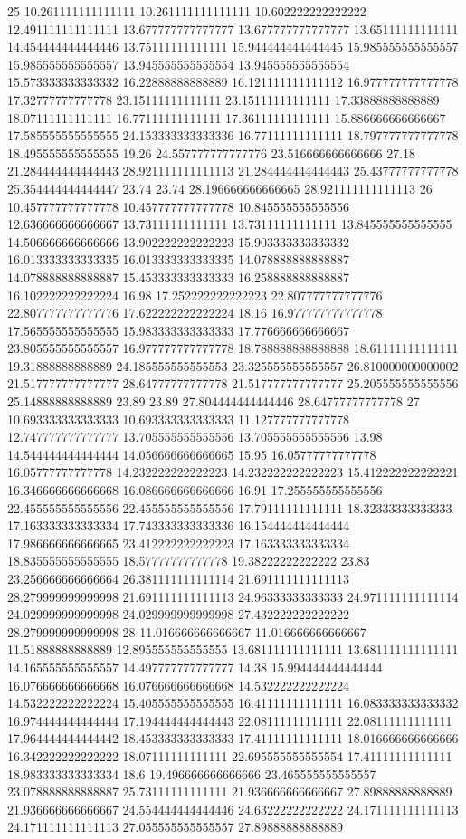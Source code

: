 25 10.261111111111111 10.261111111111111 10.602222222222222 12.491111111111111 13.677777777777777 13.677777777777777 13.65111111111111 14.454444444444446 13.75111111111111 15.944444444444445 15.985555555555557 15.985555555555557 13.945555555555554 13.945555555555554 15.573333333333332 16.22888888888889 16.121111111111112 16.977777777777778 17.32777777777778 23.15111111111111 23.15111111111111 17.33888888888889 18.07111111111111 16.77111111111111 17.36111111111111 15.886666666666667 17.585555555555555 24.153333333333336 16.77111111111111 18.797777777777778 18.495555555555555 19.26 24.557777777777776 23.516666666666666 27.18 21.284444444444443 28.921111111111113 21.284444444444443 25.43777777777778 25.354444444444447 23.74 23.74 28.196666666666665 28.921111111111113
26 10.457777777777778 10.457777777777778 10.845555555555556 12.636666666666667 13.73111111111111 13.73111111111111 13.845555555555555 14.506666666666666 13.902222222222223 15.903333333333332 16.013333333333335 16.013333333333335 14.078888888888887 14.078888888888887 15.453333333333333 16.258888888888887 16.102222222222224 16.98 17.252222222222223 22.807777777777776 22.807777777777776 17.622222222222224 18.16 16.977777777777778 17.565555555555555 15.983333333333333 17.776666666666667 23.805555555555557 16.977777777777778 18.788888888888888 18.61111111111111 19.31888888888889 24.185555555555553 23.325555555555557 26.810000000000002 21.517777777777777 28.64777777777778 21.517777777777777 25.205555555555556 25.14888888888889 23.89 23.89 27.804444444444446 28.64777777777778
27 10.693333333333333 10.693333333333333 11.127777777777778 12.747777777777777 13.705555555555556 13.705555555555556 13.98 14.544444444444444 14.056666666666665 15.95 16.05777777777778 16.05777777777778 14.232222222222223 14.232222222222223 15.412222222222221 16.346666666666668 16.086666666666666 16.91 17.255555555555556 22.455555555555556 22.455555555555556 17.79111111111111 18.32333333333333 17.163333333333334 17.743333333333336 16.154444444444444 17.986666666666665 23.412222222222223 17.163333333333334 18.835555555555555 18.57777777777778 19.38222222222222 23.83 23.256666666666664 26.381111111111114 21.691111111111113 28.279999999999998 21.691111111111113 24.96333333333333 24.971111111111114 24.029999999999998 24.029999999999998 27.432222222222222 28.279999999999998
28 11.016666666666667 11.016666666666667 11.51888888888889 12.895555555555555 13.681111111111111 13.681111111111111 14.165555555555557 14.497777777777777 14.38 15.994444444444444 16.076666666666668 16.076666666666668 14.532222222222224 14.532222222222224 15.405555555555555 16.41111111111111 16.083333333333332 16.974444444444444 17.194444444444443 22.08111111111111 22.08111111111111 17.964444444444442 18.453333333333333 17.41111111111111 18.016666666666666 16.342222222222222 18.07111111111111 22.695555555555554 17.41111111111111 18.983333333333334 18.6 19.496666666666666 23.465555555555557 23.078888888888887 25.73111111111111 21.936666666666667 27.89888888888889 21.936666666666667 24.554444444444446 24.63222222222222 24.171111111111113 24.171111111111113 27.055555555555557 27.89888888888889
